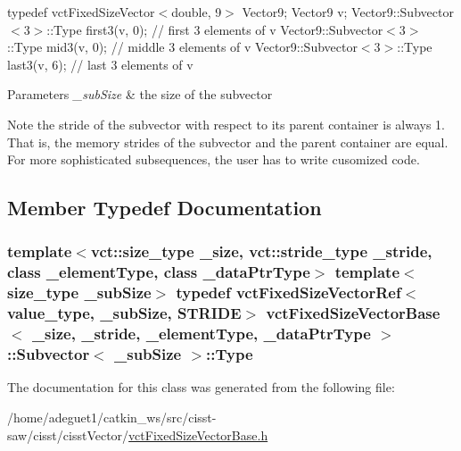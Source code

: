 typedef vct\-Fixed\-Size\-Vector$<$double, 9$>$ Vector9; Vector9 v; Vector9\-::\-Subvector$<$3$>$\-::\-Type first3(v, 0); // first 3 elements of v Vector9\-::\-Subvector$<$3$>$\-::\-Type mid3(v, 0); // middle 3 elements of v Vector9\-::\-Subvector$<$3$>$\-::\-Type last3(v, 6); // last 3 elements of v


\begin{DoxyParams}{Parameters}
{\em \-\_\-sub\-Size} & the size of the subvector\\
\hline
\end{DoxyParams}
\begin{DoxyNote}{Note}
the stride of the subvector with respect to its parent container is always 1. That is, the memory strides of the subvector and the parent container are equal. For more sophisticated subsequences, the user has to write cusomized code. 
\end{DoxyNote}


\subsection{Member Typedef Documentation}
\hypertarget{classvct_fixed_size_vector_base_1_1_subvector_a069ff7943ff217639b0dbb273d052647}{
\subsubsection[{Type}]{\setlength{\rightskip}{0pt plus 5cm}template$<$vct\-::size\-\_\-type \-\_\-size, vct\-::stride\-\_\-type \-\_\-stride, class \-\_\-element\-Type, class \-\_\-data\-Ptr\-Type$>$ template$<$size\-\_\-type \-\_\-sub\-Size$>$ typedef {\bf vct\-Fixed\-Size\-Vector\-Ref}$<$value\-\_\-type, \-\_\-sub\-Size, {\bf S\-T\-R\-I\-D\-E}$>$ {\bf vct\-Fixed\-Size\-Vector\-Base}$<$ \-\_\-size, \-\_\-stride, \-\_\-element\-Type, \-\_\-data\-Ptr\-Type $>$\-::{\bf Subvector}$<$ \-\_\-sub\-Size $>$\-::{\bf Type}}}\label{classvct_fixed_size_vector_base_1_1_subvector_a069ff7943ff217639b0dbb273d052647}


The documentation for this class was generated from the following file\-:\begin{DoxyCompactItemize}
\item 
/home/adeguet1/catkin\-\_\-ws/src/cisst-\/saw/cisst/cisst\-Vector/\hyperlink{vct_fixed_size_vector_base_8h}{vct\-Fixed\-Size\-Vector\-Base.\-h}\end{DoxyCompactItemize}
